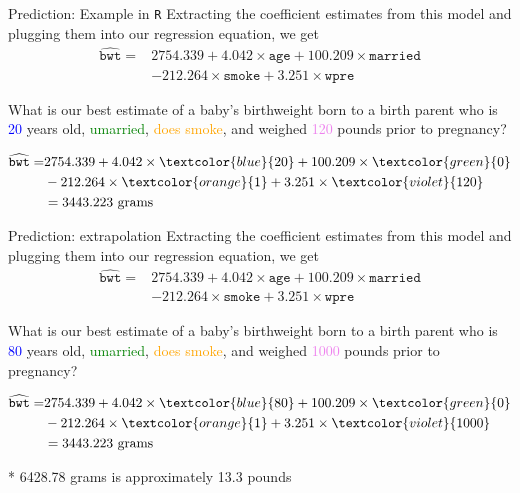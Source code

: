 \documentclass[10pt,t]{beamer}
\begin{document}
\begin{frame}{Prediction: Example in \texttt{R}}
Extracting the coefficient estimates from this model and plugging them into our regression equation, we get
\begin{align*}
	\widehat{\texttt{bwt}} = & 2754.339 + 4.042 \times \texttt{age} + 100.209 \times \texttt{married} \\
	& - 212.264 \times \texttt{smoke} + 3.251 \times \texttt{wpre} 
\end{align*}

What is our best estimate of a baby's birthweight born to a birth parent who is \textcolor{blue}{20} years old, \textcolor{green}{umarried}, \textcolor{orange}{does smoke}, and weighed \textcolor{violet}{120} pounds prior to pregnancy?

\begin{align*}
\widehat{\texttt{bwt}} = & 2754.339 + 4.042 \times \textcolor{blue}{20} + 100.209 \times \textcolor{green}{0} \\
& - 212.264 \times \textcolor{orange}{1} + 3.251 \times \textcolor{violet}{120}  \\
& = 3443.223 \text{ grams}
\end{align*}

\end{frame}

\begin{frame}{Prediction: extrapolation}
Extracting the coefficient estimates from this model and plugging them into our regression equation, we get
\begin{align*}
	\widehat{\texttt{bwt}} = & 2754.339 + 4.042 \times \texttt{age} + 100.209 \times \texttt{married} \\
	& - 212.264 \times \texttt{smoke} + 3.251 \times \texttt{wpre} 
\end{align*}

What is our best estimate of a baby's birthweight born to a birth parent who is \textcolor{blue}{80} years old, \textcolor{green}{umarried}, \textcolor{orange}{does smoke}, and weighed \textcolor{violet}{1000} pounds prior to pregnancy?

\begin{align*}
\widehat{\texttt{bwt}} = & 2754.339 + 4.042 \times \textcolor{blue}{80} + 100.209 \times \textcolor{green}{0} \\
& - 212.264 \times \textcolor{orange}{1} + 3.251 \times \textcolor{violet}{1000}  \\
& = 3443.223 \text{ grams}
\end{align*}

* 6428.78 grams is approximately 13.3 pounds

\end{frame}
\end{document}
